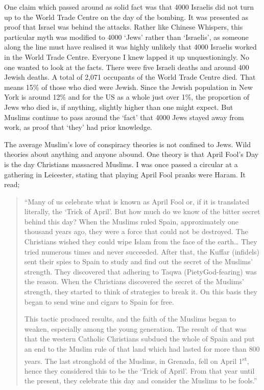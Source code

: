 \documentclass[12pt]{memoir}
\let \Sup=\textsuperscript
\def\/{\discretionary{/}{}{/}}
\begin{document}
One claim which passed around as solid fact was that 4000 Israelis
did not turn up to the World Trade Centre on the day of the bombing.
It was presented as proof that Israel was behind the attacks.
Rather like Chinese Whispers, this particular myth was modified
to 4000 ‘Jews’ rather than ‘Israelis’,
as someone along the line must have realised
it was highly unlikely that 4000 Israelis worked in the World Trade Centre.
Everyone I knew lapped it up unquestioningly.
No one wanted to look at the facts.
There were five Israeli deaths and around 400 Jewish deaths.
A total of 2,071 occupants of the World Trade Centre died.
That means 15\% of those who died were Jewish.
Since the Jewish population in New York is around 12\%
and for the US as a whole just over 1\%,
the proportion of Jews who died is, if anything,
slightly higher than one might expect.
But Muslims continue to pass around the ‘fact’
that 4000 Jews stayed away from work,
as proof that ‘they’ had prior knowledge.

The average Muslim’s love of conspiracy theories is not confined to Jews.
Wild theories about anything and anyone abound.
One theory is that April Fool’s Day is the day Christians massacred Muslims.
I was once passed a circular at a gathering in Leicester,
stating that playing April Fool pranks were Haram.
It read;

\begin{quote}
“Many of us celebrate what is known as April Fool or,
if it is translated literally, the ‘Trick of April’.
But how much do we know of the bitter secret behind this day?
When the Muslims ruled Spain, approximately one thousand years ago,
they were a force that could not be destroyed.
The Christians wished they could wipe Islam from the face of the earth…
They tried numerous times and never succeeded.
After that, the Kuffar (infidels) sent their spies to Spain
to study and find out the secret of the Muslims’ strength.
They discovered that adhering to Taqwa (Piety\/God-fearing) was the reason.
When the Christians discovered the secret of the Muslims’ strength,
they started to think of strategies to break it.
On this basis they began to send wine and cigars to Spain for free.

This tactic produced results, and the faith of the Muslims began to weaken,
especially among the young generation.
The result of that was that the western Catholic Christians subdued
the whole of Spain and put an end to the Muslim rule of that land
which had lasted for more than 800 years.
The last stronghold of the Muslims, in Grenada, fell on April 1\Sup{st},
hence they considered this to be the ‘Trick of April’.
From that year until the present,
they celebrate this day and consider the Muslims to be fools.”
\end{quote}
\end{document}
